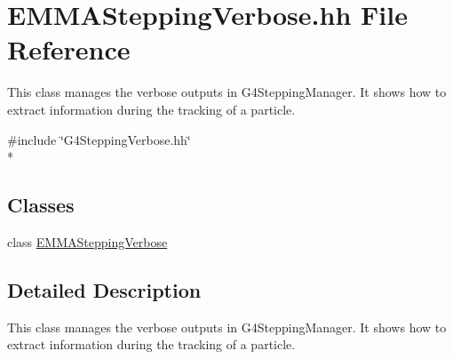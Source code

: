 \hypertarget{EMMASteppingVerbose_8hh}{\section{E\-M\-M\-A\-Stepping\-Verbose.\-hh File Reference}
\label{EMMASteppingVerbose_8hh}
}


This class manages the verbose outputs in G4\-Stepping\-Manager. It shows how to extract information during the tracking of a particle.  


{\ttfamily \#include \char`\"{}G4\-Stepping\-Verbose.\-hh\char`\"{}}\\*
\subsection*{Classes}
\begin{DoxyCompactItemize}
\item 
class \hyperlink{classEMMASteppingVerbose}{E\-M\-M\-A\-Stepping\-Verbose}
\end{DoxyCompactItemize}


\subsection{Detailed Description}
This class manages the verbose outputs in G4\-Stepping\-Manager. It shows how to extract information during the tracking of a particle. 